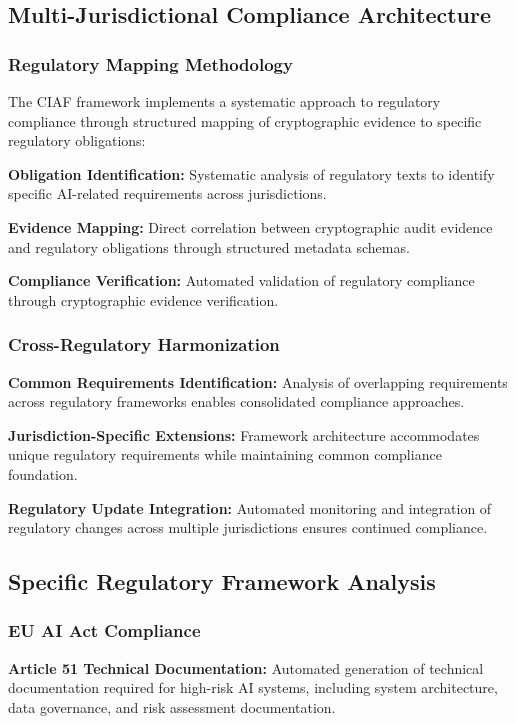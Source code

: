 \documentclass[12pt,a4paper]{article}
\begin{document}
\subsection{Multi-Jurisdictional Compliance Architecture}

\subsubsection{Regulatory Mapping Methodology}

The CIAF framework implements a systematic approach to regulatory compliance through structured mapping of cryptographic evidence to specific regulatory obligations:

\textbf{Obligation Identification:} Systematic analysis of regulatory texts to identify specific AI-related requirements across jurisdictions.

\textbf{Evidence Mapping:} Direct correlation between cryptographic audit evidence and regulatory obligations through structured metadata schemas.

\textbf{Compliance Verification:} Automated validation of regulatory compliance through cryptographic evidence verification.

\subsubsection{Cross-Regulatory Harmonization}

\textbf{Common Requirements Identification:} Analysis of overlapping requirements across regulatory frameworks enables consolidated compliance approaches.

\textbf{Jurisdiction-Specific Extensions:} Framework architecture accommodates unique regulatory requirements while maintaining common compliance foundation.

\textbf{Regulatory Update Integration:} Automated monitoring and integration of regulatory changes across multiple jurisdictions ensures continued compliance.

\subsection{Specific Regulatory Framework Analysis}

\subsubsection{EU AI Act Compliance}

\textbf{Article 51 Technical Documentation:} Automated generation of technical documentation required for high-risk AI systems, including system architecture, data governance, and risk assessment documentation.
\end{document}
